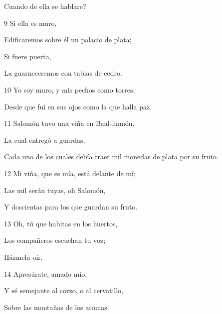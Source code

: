 \par Cuando de ella se hablare?
\par 9 Si ella es muro,
\par Edificaremos sobre él un palacio de plata;
\par Si fuere puerta,
\par La guarneceremos con tablas de cedro.
\par 10 Yo soy muro, y mis pechos como torres,
\par Desde que fui en sus ojos como la que halla paz.
\par 11 Salomón tuvo una viña en Baal-hamón,
\par La cual entregó a guardas,
\par Cada uno de los cuales debía traer mil monedas de plata por su fruto.
\par 12 Mi viña, que es mía, está delante de mí;
\par Las mil serán tuyas, oh Salomón,
\par Y doscientas para los que guardan su fruto.
\par 13 Oh, tú que habitas en los huertos,
\par Los compañeros escuchan tu voz;
\par Házmela oír.
\par 14 Apresúrate, amado mío,
\par Y sé semejante al corzo, o al cervatillo,
\par Sobre las montañas de los aromas.

